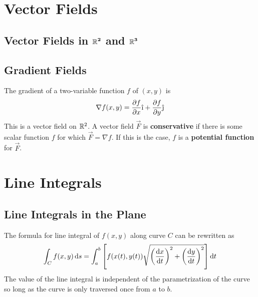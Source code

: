 \documentclass[./Calculus \Roman{3}.tex]{subfiles}
\begin{document}
	\section{Vector Fields}
		\subsection*{Vector Fields in $\bm{\mathbb{R}^2}$ and $\bm{\mathbb{R}^3}$}
		\subsection*{Gradient Fields}
			The gradient of a two-variable function $f$ of $(x, y)$ is
				\[\nabla f(x, y) = \pder{f}{x}\vi + \pder{f}{y}\vj\]
				This is a vector field on $\mathbb{R}^2$.
			A vector field $\vec{F}$ is \textbf{conservative} if there is some scalar function $f$ for which $\vec{F} = \nabla f$. If this is the case, $f$ is a \textbf{potential function} for $\vec{F}$.
	\section{Line Integrals}
		\subsection*{Line Integrals in the Plane}
			The formula for line integral of $f(x, y)$ along curve $C$ can be rewritten as 
				\[\int_C f(x, y)\,\mathrm{d} s = \int_a^b\left[f(x(t), y(t))\sqrt{\left(\frac{\mathrm{d} x}{\mathrm{d} t}\right)^2 + \left(\frac{\mathrm{d} y}{\mathrm{d} t}\right)^2}\right]\mathrm{d} t\]
			The value of the line integral is independent of the parametrization of the curve so long as the curve is only traversed once from $a$ to $b$.
\end{document}
